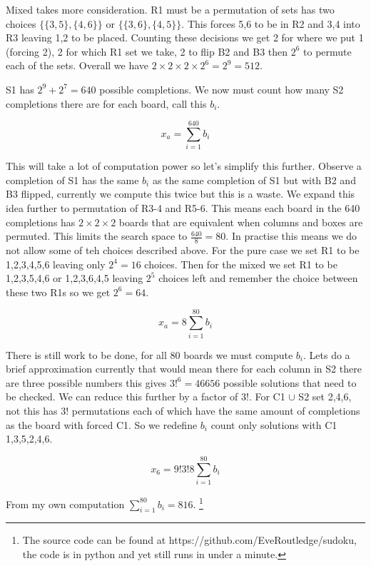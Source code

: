 \documentclass[a4paper,11pt]{report}
\newcounter{col}
\begin{document}
Mixed takes more consideration. R1 must be a permutation of sets has two choices $\{\{3,5\},\{4,6\}\}$ or $\{\{3,6\},\{4,5\}\}$. This forces 5,6 to be in R2 and 3,4 into R3 leaving 1,2 to be placed. Counting these decisions we get 2 for where we put 1 (forcing 2), 2 for which R1 set we take, 2 to flip B2 and B3 then $2^6$ to permute each of the sets. Overall we have $2\times 2 \times 2 \times 2^6=2^9=512$. 

S1 has $2^9+2^7=640$ possible completions. We now must count how many S2 completions there are for each board, call this $b_i$.

\begin{equation}x_a = \sum^{640}_{i=1}b_i\end{equation}

This will take a lot of computation power so let's simplify this further. Observe a completion of S1 has the same $b_i$ as the same completion of S1 but with B2 and B3 flipped, currently we compute this twice but this is a waste. We expand this idea further to permutation of R3-4 and R5-6. This means each board in the 640 completions has $2\times 2\times 2$ boards that are equivalent when columns and boxes are permuted. This limits the search space to $\frac{640}{8}=80$. In practise this means we do not allow some of teh choices described above. For the pure case we set R1 to be 1,2,3,4,5,6 leaving only $2^4=16$ choices. Then for the mixed we set R1 to be 1,2,3,5,4,6 or 1,2,3,6,4,5 leaving $2^5$ choices left and remember the choice between these two R1s so we get $2^6=64$. 

\begin{equation}x_a=8\sum^{80}_{i=1}b_i\end{equation}

There is still work to be done, for all 80 boards we must compute $b_i$. Lets do a brief approximation currently that would mean there for each column in S2 there are three possible numbers this gives $3!^6 = 46656$ possible solutions that need to be checked. We can reduce this further by a factor of 3!. For C1 $\cup$ S2 set 2,4,6, not this has 3! permutations each of which have the same amount of completions as the board with forced C1. So we redefine $b_i$ count only solutions with C1 1,3,5,2,4,6.

\begin{equation}x_6=9!3!8\sum^{80}_{i=1} b_i\end{equation}

From my own computation $\sum^{80}_{i=1} b_i=816$. \footnote{The source code can be found at https://github.com/EveRoutledge/sudoku, the code is in python and yet still runs in under a minute.}
\end{document}
